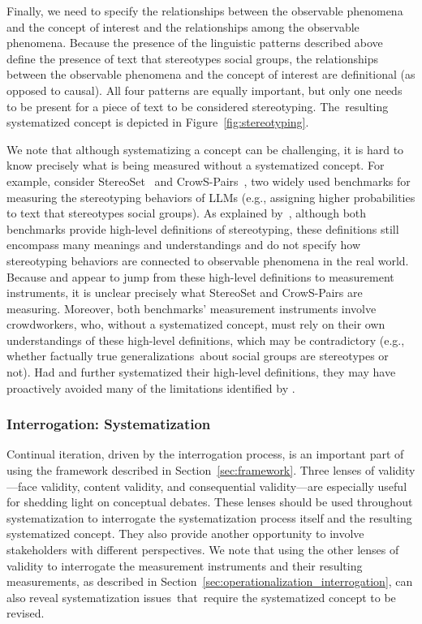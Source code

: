 \documentclass{article}
\begin{document}
Finally, we need to specify the  relationships between the observable phenomena and the concept of interest and the relationships among the observable phenomena. Because the presence of the linguistic patterns described above define the presence of text that stereotypes social groups, the relationships between the observable phenomena and the concept of interest are definitional (as opposed to causal). All four patterns are equally important, but only one needs to be present for a piece of text to be considered stereotyping. The~resulting systematized concept is depicted in Figure~\ref{fig:stereotyping}.

We note that although systematizing a concept can be challenging, it is hard to know precisely what is being measured without a systematized concept. For example, consider StereoSet~\citep{nadeem2020stereoset} and CrowS-Pairs~\citep{nangia2020crows}, two widely used benchmarks for measuring the stereotyping behaviors of LLMs (e.g., assigning higher probabilities to text that stereotypes social groups). 
As explained by~\citet{blodgett2021stereotyping},
although both benchmarks provide high-level definitions of stereotyping, these definitions 
still encompass many meanings and understandings and
do not specify how stereotyping behaviors are connected to observable phenomena in the real world. 
Because \citeauthor{nadeem2020stereoset} and \citeauthor{nangia2020crows} appear to jump from these high-level definitions to measurement instruments, it is unclear precisely what StereoSet and CrowS-Pairs are measuring. Moreover, both benchmarks' measurement instruments involve crowdworkers, who, without a 
systematized concept, must rely on their own understandings of these high-level definitions, which may be contradictory (e.g., whether factually true generalizations~about social groups are stereotypes or not). Had \citeauthor{nadeem2020stereoset} and \citeauthor{nangia2020crows} further systematized their high-level definitions, they may have proactively avoided many of the limitations identified by \citet{blodgett2021stereotyping}.

\subsubsection{Interrogation: Systematization}

Continual iteration, driven by the interrogation process, is an important part of using the framework described in Section~\ref{sec:framework}. Three lenses of validity---face validity, content validity, and consequential validity---are especially useful for shedding light on conceptual debates. These lenses should be used throughout systematization to interrogate the systematization process itself and the resulting systematized concept. They also provide another opportunity to involve stakeholders with different perspectives. We note that using the other lenses of validity to interrogate the measurement instruments and their resulting measurements, as described in Section~\ref{sec:operationalization_interrogation}, can also reveal systematization issues~that~require the systematized concept to be revised.
\end{document}
